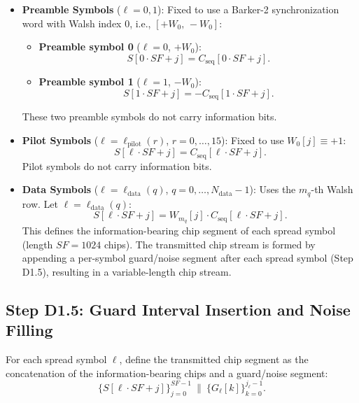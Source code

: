 \documentclass[11pt]{article}
\begin{document}
\begin{itemize}
\item \textbf{Preamble Symbols} ($\ell=0,1$): Fixed to use a Barker-2 synchronization word with Walsh index 0, i.e., $[+W_0,\,-W_0]$:
  \begin{itemize}
  \item \textbf{Preamble symbol 0} ($\ell=0$, $+W_0$):
    \[
      S[0\cdot \mathit{SF} + j] = C_{\text{seq}}[0\cdot \mathit{SF} + j].
    \]
  \item \textbf{Preamble symbol 1} ($\ell=1$, $-W_0$):
    \[
      S[1\cdot \mathit{SF} + j] = -C_{\text{seq}}[1\cdot \mathit{SF} + j].
    \]
  \end{itemize}
  These two preamble symbols do not carry information bits.

\item \textbf{Pilot Symbols} ($\ell=\ell_{\text{pilot}}(r)$, $r=0,\dots,15$): Fixed to use $W_0[j]\equiv +1$:
  \[
    S[\ell\cdot \mathit{SF} + j] = C_{\text{seq}}[\ell\cdot \mathit{SF} + j].
  \]
  Pilot symbols do not carry information bits.

\item \textbf{Data Symbols} ($\ell=\ell_{\text{data}}(q)$, $q=0,\dots,N_{\text{data}}-1$): Uses the $m_q$-th Walsh row. Let $\ell=\ell_{\text{data}}(q)$:
  \[
    S[\ell\cdot \mathit{SF} + j] = W_{m_q}[j]\cdot C_{\text{seq}}[\ell\cdot \mathit{SF} + j].
  \]
  This defines the information-bearing chip segment of each spread symbol (length $\mathit{SF}=1024$ chips). The transmitted chip stream is formed by appending a per-symbol guard/noise segment after each spread symbol (Step D1.5), resulting in a variable-length chip stream.
\end{itemize}

\subsection{Step D1.5: Guard Interval Insertion and Noise Filling}

For each spread symbol $\ell$, define the transmitted chip segment as the concatenation of the information-bearing chips and a guard/noise segment:
\[
  \{S[\ell\cdot \mathit{SF}+j]\}_{j=0}^{\mathit{SF}-1}\ \parallel\ \{G_\ell[k]\}_{k=0}^{j_\ell-1}.
\]
\end{document}
